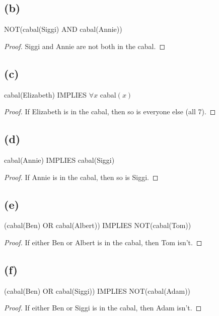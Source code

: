 \documentclass[14pt]{extarticle}
\begin{document}
\subsection{(b)}
NOT(cabal(Siggi) AND cabal(Annie))
\begin{proof}
Siggi and Annie are not both in the cabal. 
\end{proof}
\subsection{(c)}
cabal(Elizabeth) IMPLIES $\forall x$ cabal$(x)$
\begin{proof}
If Elizabeth is in the cabal, then so is everyone else (all 7).
\end{proof}
\subsection{(d)}
cabal(Annie) IMPLIES cabal(Siggi)
\begin{proof}
If Annie is in the cabal, then so is Siggi.
\end{proof}
\subsection{(e)}
(cabal(Ben) OR cabal(Albert)) IMPLIES NOT(cabal(Tom))
\begin{proof}
If either Ben or Albert is in the cabal, then Tom isn't.
\end{proof}
\subsection{(f)}
(cabal(Ben) OR cabal(Siggi)) IMPLIES NOT(cabal(Adam))
\begin{proof}
If either Ben or Siggi is in the cabal, then Adam isn't.
\end{proof}
\end{document}
